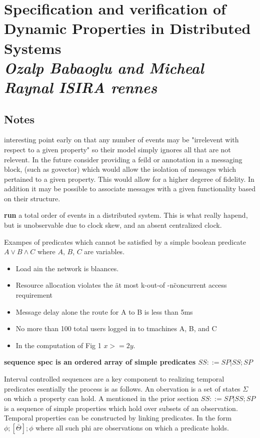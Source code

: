 \section{Specification and verification of Dynamic Properties in Distributed Systems \\ \small\textit{Ozalp Babaoglu and Micheal Raynal ISIRA rennes}}

\subsection{Notes} interesting point early on that any number of events may be
"irrelevent with respect to a given property" so their model simply ignores
all that are not relevent. In the future consider providing a feild or
annotation in a messaging block, (such as govector) which would allow the
isolation of messages which pertained to a given property. This would allow
for a higher degeree of fidelity. In addition it may be possible to associate
messages with a given functionality based on their structure.

\noindent\textbf{run} a total order of events in a distributed system. This is what really hapend, but is unobservable due to clock skew, and an absent centralized clock.

Exampes of predicates which cannot be satisfied by a simple boolean predicate $A \vee B \wedge C$ where $A$, $B$, $C$ are variables.

\begin{itemize}
    \item Load ain the network is blaances.
    \item Resource allocation violates the \"at most k-out-of -n\" concurrent access requirement
    \item Message delay alone the route for A to B is less than 5ms
    \item No more than 100 total users logged in to tmachines A, B, and C
    \item In the computation of Fig 1 $x >= 2y$.
\end{itemize}

\noindent\textbf{sequence spec is an ordered array of simple predicates $SS ::= SP | SS; SP$}

Interval controlled sequences are a key component to realizing temporal
predicates esentially the process is as follows. An obervation is a set of
states $\Sigma$ on which a property can hold. A mentioned in the prior section
$SS ::= SP | SS; SP$ is a sequence of simple properties which hold over subsets
of an observation. Temporal properties can be constructed by linking
predicates. In the form $\phi;[\bar{\Theta}];\phi$ where all such phi are
observations on which a predicate holds.

